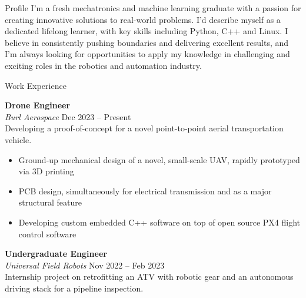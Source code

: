\documentclass{custom-resume}
\begin{document}
\begin{minipage}[t]{0.61\textwidth}

  \raggedright


  \begin{section}{Profile}
    I'm a fresh mechatronics and machine learning graduate with a passion for creating innovative solutions to real-world problems. I'd describe myself as a dedicated lifelong learner, with key skills including Python, C++ and Linux. I believe in consistently pushing boundaries and delivering excellent results, and I'm always looking for opportunities to apply my knowledge in challenging and exciting roles in the robotics and automation industry.
  \end{section}

  \SectionRule


  \begin{section}{Work Experience}

    \textbf{Drone Engineer} \\[8pt]

    \textit{Burl Aerospace} \hfill Dec 2023 -- Present \\[8pt]

    Developing a proof-of-concept for a novel point-to-point aerial transportation vehicle.

    \begin{itemize}[leftmargin=*]
      \item Ground-up mechanical design of a novel, small-scale UAV, rapidly prototyped via 3D printing
      \item PCB design, simultaneously for electrical transmission and as a major structural feature
      \item Developing custom embedded C++ software on top of open source PX4 flight control software
    \end{itemize}

    \vspace{8pt}

    \textbf{Undergraduate Engineer} \\[8pt]

    \textit{Universal Field Robots} \hfill Nov 2022 -- Feb 2023\\[8pt]

    Internship project on retrofitting an ATV with robotic gear and an autonomous driving stack for a pipeline inspection.


\end{section}
\end{minipage}
\end{document}
